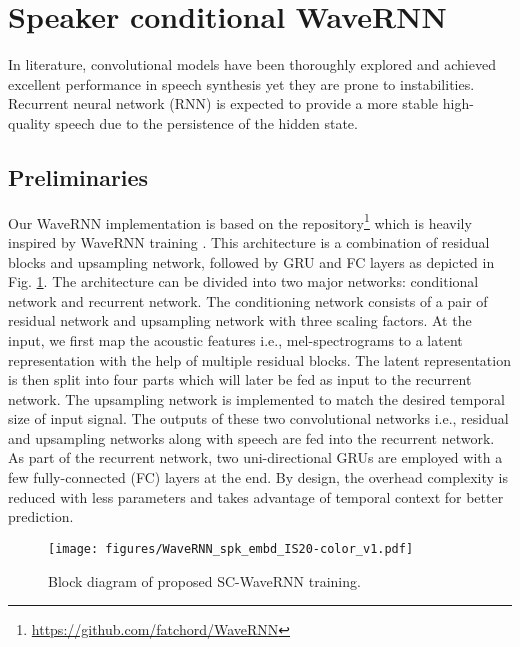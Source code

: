 \documentclass[a4paper]{article}
\begin{document}
\vspace{-2mm}
\section{Speaker conditional WaveRNN}

In literature, convolutional models have been thoroughly explored and achieved excellent performance in speech synthesis \cite{oord2016wavenet, ping2018clarinet} yet they are prone to instabilities. Recurrent neural network (RNN) is expected to provide a more stable high-quality speech due to the persistence of the hidden state.
\vspace{-2mm}
\subsection{Preliminaries}
Our WaveRNN implementation is based on the repository\footnote{\url{https://github.com/fatchord/WaveRNN}} which is heavily inspired by WaveRNN training \cite{kalchbrenner2018efficient}.  This architecture is a combination of residual blocks and upsampling network, followed by GRU and FC layers as depicted in Fig. \ref{wavernn}. The architecture can be divided into two major networks: conditional network and recurrent network. The conditioning network consists of a pair of residual network and upsampling network with three scaling factors. At the input, we first map the acoustic features i.e., mel-spectrograms to a latent representation with the help of multiple residual blocks. The latent representation is then split into four parts which will later be fed as input to the recurrent network. The upsampling network is implemented to match the desired temporal size of input signal. The outputs of these two convolutional networks i.e., residual and upsampling networks along with speech are fed into the recurrent network. As part of the recurrent network, two uni-directional GRUs are employed with a few fully-connected (FC) layers at the end. By design, the overhead complexity is reduced  with less parameters and takes advantage of temporal context for better prediction.
\vspace{-2mm}


\begin{figure}[h!]
  \begin{center}
  \vspace{-2mm}
    \texttt{[image: figures/WaveRNN\_spk\_embd\_IS20-color\_v1.pdf]}
  \end{center}
  \vspace{-8mm}
  \caption{\small Block diagram of proposed SC-WaveRNN training.}
  \vspace{-7mm}
  \label{wavernn}
\end{figure}
\end{document}
